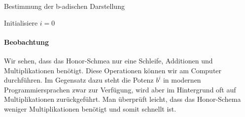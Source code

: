 \begin{algorithm}[H]
 \caption{Bestimmung der b-adischen Darstellung}
 Initialisiere $i=0$ \\
 \end{algorithm}

\paragraph{Beobachtung}
Wir sehen, dass das Honor-Schmea nur eine Schleife, Additionen und Multiplikationen benötigt. 
Diese Operationen können wir am Computer durchführen. 
Im Gegensatz dazu steht die Potenz $b^{i}$ in modernen Programmiersprachen zwar zur Verfügung, wird aber im Hintergrund oft auf Multiplikationen zurückgeführt.
Man überprüft leicht, dass das Honor-Schema weniger Multiplikationen benötigt und somit schnellt ist.
